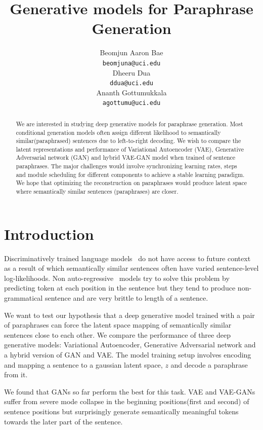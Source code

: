 \documentclass{article}
\title{Generative models for Paraphrase Generation}
\author{
  Beomjun Aaron Bae \\
  \texttt{beomjuna@uci.edu} \\
   \And
   Dheeru Dua \\
  \texttt{ddua@uci.edu} \\
   \AND
  Ananth Gottumukkala \\
  \texttt{agottumu@uci.edu} \\
}
\begin{document}
\maketitle

\begin{abstract}

 We are interested in studying deep generative models for paraphrase generation. Most conditional generation models often assign different likelihood to semantically similar(paraphrased) sentences due to left-to-right decoding. We wish to compare the latent representations and performance of Variational Autoencoder (VAE), Generative Adversarial network (GAN) and hybrid VAE-GAN model when trained of sentence paraphrases. The major challenges would involve synchronizing learning rates, steps and module scheduling for different components to achieve a stable learning paradigm. We hope that optimizing the reconstruction on paraphrases would produce latent space where semantically similar sentences (paraphrases) are closer.
  
\end{abstract}

\section{Introduction}
Discriminatively trained language models~\cite{radford2019language} do not have access to future context as a result of which semantically similar sentences often have varied sentence-level log-likelihoods. Non auto-regressive~\cite{ma2019flowseq} models try to solve this problem by predicting token at each position in the sentence but they tend to produce non-grammatical sentence and are very brittle to length of a sentence.

We want to test our hypothesis that a deep generative model trained with a pair of paraphrases can force the latent space mapping of semantically similar sentences close to each other. We compare the performance of three deep generative models: Variational Autoencoder, Generative Adversarial network and a hybrid version of GAN and VAE. The model training setup involves encoding and mapping a sentence to a gaussian latent space, $z$ and decode a paraphrase from it.

We found that GANs so far perform the best for this task. VAE and VAE-GANs suffer from severe mode collapse in the beginning positions(first and second) of sentence positions but surprisingly generate semantically meaningful tokens towards the later part of the sentence.
\end{document}
